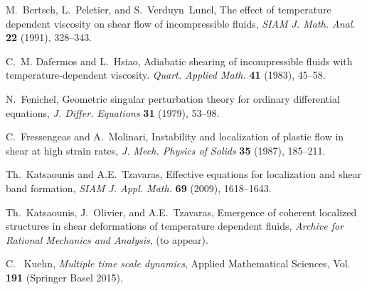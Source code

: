 \documentclass[graybox]{svmult}
\begin{document}
\begin{thebibliography}{10}


{\sc M.~Bertsch, L.~Peletier, and S.~Verduyn~Lunel}, 
The effect of temperature dependent viscosity on shear flow of  incompressible fluids,
{\em SIAM J. Math. Anal.} {\bf 22 } (1991), 328--343.


{\sc C.~M. Dafermos and L.~Hsiao}, 
Adiabatic shearing of incompressible fluids with temperature-dependent viscosity.
{\em Quart.  Applied Math.} {\bf 41} (1983), 45--58.


{\sc N.~Fenichel}, 
Geometric singular perturbation theory for ordinary differential equations, 
{\it J. Differ. Equations} {\bf 31} (1979), 53--98.

{\sc C.~Fressengeas and A.~Molinari}, 
Instability and localization of plastic flow in shear at high strain rates, 
  {\em J.  Mech. Physics of Solids} {\bf 35} (1987), 185--211.

  
{\sc Th.~Katsaounis and A.E.~Tzavaras}, 
 Effective equations for localization and shear band formation, 
 {\em SIAM J. Appl. Math.}  {\bf 69} (2009), 1618--1643.
  
{\sc Th.~Katsaounis, J.~Olivier, and A.E.~Tzavaras}, 
Emergence of coherent localized structures in shear deformations of
  temperature dependent fluids, {\em Archive for Rational Mechanics and Analysis}, (to appear).

{\sc C.~ Kuehn}, 
{\it Multiple time scale dynamics}, Applied Mathematical Sciences, Vol. {\bf 191} (Springer Basel 2015).
  

\end{thebibliography}
\end{document}
